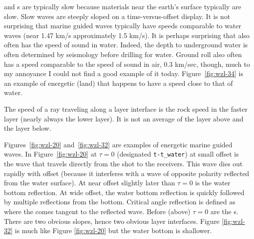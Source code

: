 \par
{}
and s are typically slow
because materials near the earth's surface typically are slow.
Slow waves are steeply sloped on a time-versus-offset display.
It is not surprising that marine guided waves
typically have speeds comparable to water waves
(near 1.47 km/s approximately 1.5 km/s).
It is perhaps surprising that 
also often has the speed of sound in water.
Indeed, the depth to underground water is often determined
by seismology before drilling for water.
Ground roll also often has a speed
comparable to the speed of sound in air,
0.3 km/sec, though, much to my annoyance I could not find
a good example of it today.
Figure~\ref{fig:wzl-34} is an example of energetic  (land)
that happens to have a speed close to that of water.

\par
The speed of a ray traveling along a layer interface
is the rock speed in the faster layer (nearly always the lower layer).
It is not an average of the layer above and the layer below.


\par
Figures~\ref{fig:wzl-20} and~\ref{fig:wzl-32}
are examples of energetic marine guided waves.
In Figure~\ref{fig:wzl-20}
at $\tau=0$ (designated {\tt t-t\_water}) at small offset
is the wave that travels directly from the shot to the receivers.
This wave dies out rapidly with offset
(because it interferes with a wave of opposite polarity
reflected from the water surface).
At near offset slightly later than $\tau=0$ is the water bottom reflection.
At wide offset, the water bottom reflection is quickly followed
by multiple reflections from the bottom.
Critical angle reflection is defined as where the 
comes tangent to the reflected wave.
Before (above) $\tau=0$ are the s.
There are two obvious slopes,
hence two obvious layer interfaces.
Figure \ref{fig:wzl-32} is much like Figure \ref{fig:wzl-20}
but the water bottom is shallower.

